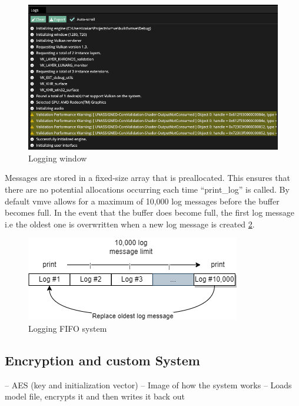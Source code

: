 \documentclass[11pt]{article}
\begin{document}
\begin{figure}[H]
  \centering
  \includegraphics[width=\textwidth]{images/logging_window.png}
  \caption{Logging window}
  \label{fig:logging_window}
\end{figure}

Messages are stored in a fixed-size array that is preallocated. This ensures
that there are no potential allocations occurring each time ``print\_log''  is
called. By default \gls*{vmve} allows for a maximum of 10,000 log messages before
the buffer becomes full. In the event that the buffer does become full, the
first log message i.e the oldest one is overwritten when a new log message is
created \ref{fig:logging_system}. 

\begin{figure}[H]
  \centering
  \includegraphics[width=\textwidth]{images/logging.png}
  \caption{Logging FIFO system}
  \label{fig:logging_system}
\end{figure}

\subsection{Encryption and custom System}

-- AES (key and initialization vector)
-- Image of how the system works 
  -- Loads model file, encrypts it and then writes it back out
\end{document}
